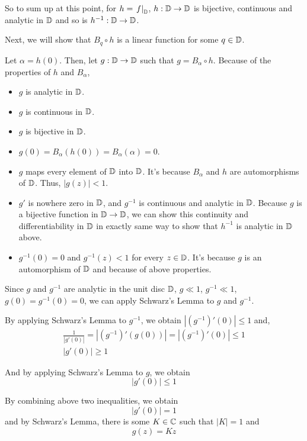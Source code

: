 So to sum up at this point, for \(h = \left. f \right|_{\mathbb{D}}\), \(h: \mathbb{D} \to \mathbb{D}\) is bijective, continuous and analytic in \(\mathbb{D}\) and so is \(h^{-1}: \mathbb{D} \to \mathbb{D}\).
\newline

\noindent
Next, we will show that \(B_q \circ h\) is a linear function for some \(q \in \mathbb{D}\).
\newline

Let \(\alpha = h(0)\).
Then, let \(g: \mathbb{D} \to \mathbb{D}\) such that \(g = B_\alpha \circ h\).
Because of the properties of \(h\) and \(B_\alpha\),
\begin{itemize}
\item \(g\) is analytic in \(\mathbb{D}\).
\item \(g\) is continuous in \(\mathbb{D}\).
\item \(g\) is bijective in \(\mathbb{D}\).
\item \(g(0) = B_\alpha(h(0)) = B_\alpha(\alpha) = 0\).
\item \(g\) maps every element of \(\mathbb{D}\) into \(\mathbb{D}\).
  It's because \(B_\alpha\) and \(h\) are automorphisms of \(\mathbb{D}\).
  Thus, \(|g(z)| < 1\).
\item \(g'\) is nowhere zero in \(\mathbb{D}\),
  and \(g^{-1}\) is continuous and analytic in \(\mathbb{D}\).
  Because \(g\) is a bijective function in \(\mathbb{D} \to \mathbb{D}\),
  we can show this continuity and differentiability in \(\mathbb{D}\)
  in exactly same way to show that \(h^{-1}\) is analytic in \(\mathbb{D}\) above.
\item \(g^{-1}(0) = 0\) and \(g^{-1}(z) < 1\) for every \(z \in \mathbb{D}\).
  It's because \(g\) is an automorphism of \(\mathbb{D}\) and because of above properties.
\end{itemize}

Since \(g\) and \(g^{-1}\) are analytic in the unit disc \(\mathbb{D}\), \(g \ll 1\), \(g^{-1} \ll 1\), \(g(0) = g^{-1}(0) = 0\), we can apply Schwarz's Lemma to \(g\) and \(g^{-1}\).

By applying Schwarz's Lemma to \(g^{-1}\), we obtain \(\left|(g^{-1})'(0)\right| \le 1\) and,
\begin{gather*}
  \frac{1}{\left|g'(0)\right|}
    = \left|(g^{-1})'(g(0))\right|
    = \left|(g^{-1})'(0)\right| \le 1 \\
  \left|g'(0)\right| \ge 1
\end{gather*}

And by applying Schwarz's Lemma to \(g\), we obtain
\[\left|g'(0)\right| \le 1\]

By combining above two inequalities, we obtain
\[\left|g'(0)\right| = 1\]
and by Schwarz's Lemma, there is some \(K \in \mathbb{C}\) such that \(|K| = 1\) and
\[g(z) = Kz\]

